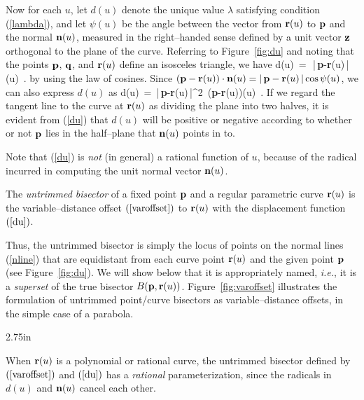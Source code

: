 
Now for each $u$, let $d(u)$ denote the unique value $\lambda$
satisfying condition (\ref{lambda}), and let $\psi(u)$ be the angle
between the vector from ${\bf r}(u)$ to ${\bf p}$ and the normal
${\bf n}(u)$, measured in the right--handed sense defined by a unit
vector ${\bf z}$ orthogonal to the plane of the curve. Referring to
Figure~\ref{fig:du} and noting that the points ${\bf p}$, ${\bf q}$,
and ${\bf r}(u)$ define an isosceles triangle, we have
\be \label{du0}
d(u) \,=\, \half\,|\,{\bf p}-{\bf r}(u)\,|\sec\psi(u) \,.
\ee
by using the law of cosines.
Since $({\bf p}-{\bf r}(u))\cdot{\bf n}(u)=|\,{\bf p}-{\bf r}(u)\,|
\cos\psi(u)$, we can also express $d(u)$ as
\be \label{du}
d(u) \,=\, {|\,{\bf p}-{\bf r}(u)\,|^2 \,({\bf p}-{\bf r}(u))(u)} \,.
\ee
If we regard the tangent line to the curve at ${\bf r}(u)$ as dividing
the plane into two halves, it is evident from (\ref{du}) that $d(u)$
will be positive or negative according to whether or not ${\bf p}$
lies in the half--plane that ${\bf n}(u)$ points in to.

Note that (\ref{du}) is {\it not\/} (in general) a rational function
of $u$, because of the radical incurred in computing the unit normal
vector ${\bf n}(u)$.

\begin{dfn}
The {\it untrimmed bisector\/} of a fixed point ${\bf p}$ and a
regular parametric curve ${\bf r}(u)$ is the variable--distance offset
$(\ref{varoffset})$ to ${\bf r}(u)$ with the displacement function
$(\ref{du})$.
\end{dfn}

Thus, the untrimmed bisector is simply the locus of points on the
normal lines (\ref{nline}) that are equidistant from each curve point
${\bf r}(u)$ and the given point ${\bf p}$ (see Figure~\ref{fig:du}).
We will show below that it is appropriately named, {\it i.e.}, it
is a {\it superset\/} of the true bisector $B({\bf p},{\bf r}(u))$.
Figure~\ref{fig:varoffset} illustrates the formulation of untrimmed
point/curve bisectors as variable--distance offsets, in the simple
case of a parabola.

{2.75in}

\begin{rmk}
{\rm
When ${\bf r}(u)$ is a polynomial or rational curve, the untrimmed
bisector defined by $(\ref{varoffset})$ and $(\ref{du})$ has a {\it
rational\/} parameterization, since the radicals in $d(u)$ and
${\bf n}(u)$ cancel each other.
}
\end{rmk}

